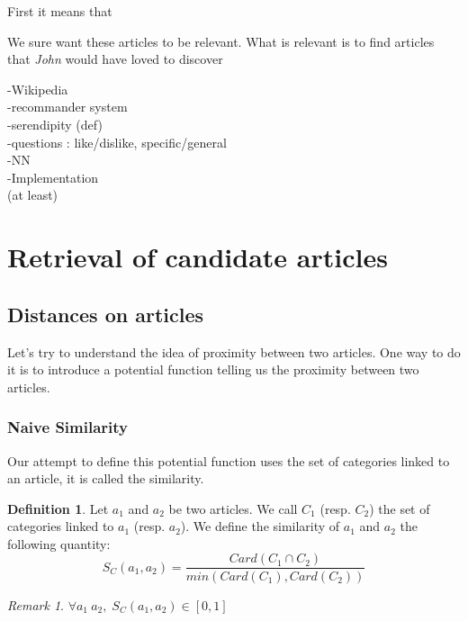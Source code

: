 \documentclass[11pt]{article}
\theoremstyle{plain}
\theoremstyle{definition}
\newtheorem{defn}{Definition}[section]
\theoremstyle{remark}
\newtheorem*{rem}{Remark}
\begin{document}
First it means that 



We sure want these articles to be relevant.  What is relevant is to find articles that \textit{John} would have loved to discover 


-Wikipedia\\
-recommander system\\
-serendipity (def)\\
-questions : like/dislike, specific/general\\
-NN\\
-Implementation\\
(at least)

\section{Retrieval of candidate articles}


\subsection{Distances on articles}

Let's try to understand the idea of proximity between two articles. One way to do it is to introduce a potential function telling us the proximity between two articles.

\subsubsection{Naive Similarity}

Our attempt to define this potential function uses the set of categories linked to an article, it is called the similarity.





\vspace*{5mm}
\begin{defn}
  \label{definition:S_w}
  Let $a_1$ and $a_2$ be two articles. We call $C_1$ (resp. $C_2$) the set of categories linked to $a_1$ (resp. $a_2$).
  We define the similarity of $a_1$ and $a_2$ the following quantity:\\
  \begin{equation*}
    S_C(a_1,a_2) = \frac{Card(C_1 \cap C_2)}{min(Card(C_1),Card(C_2))}
  \end{equation*}
\end{defn}

\begin{rem}
  $\forall a_1\: a_2,\; S_C(a_1,a_2) \in [0,1]$
\end{rem}
\end{document}
